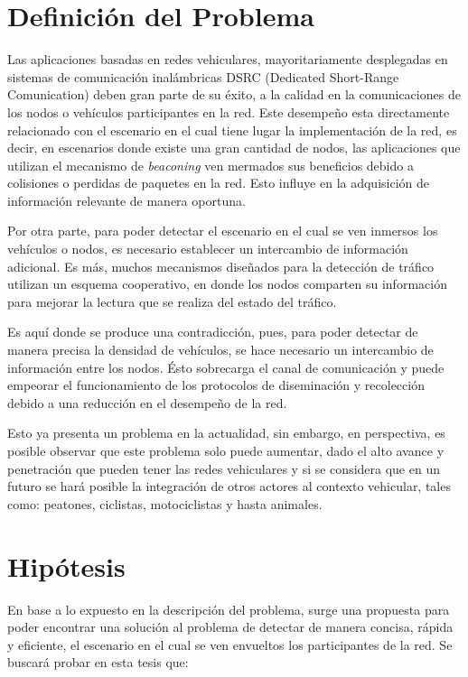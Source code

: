 \section{Definición del Problema}
Las aplicaciones basadas en redes vehiculares, mayoritariamente desplegadas en sistemas de comunicación inalámbricas DSRC (Dedicated Short-Range Comunication) deben gran parte de su éxito, a la calidad en la comunicaciones de los nodos o vehículos participantes en la red. Este desempeño esta directamente relacionado con el escenario en el cual tiene lugar la implementación de la red, es decir, en escenarios donde existe una gran cantidad de nodos, las aplicaciones que utilizan el mecanismo de \textit{beaconing} ven mermados sus beneficios debido a colisiones o perdidas de paquetes en la red. Esto influye en la adquisición de información relevante de manera oportuna. 

Por otra parte, para poder detectar el escenario en el cual se ven inmersos los vehículos o nodos, es necesario establecer un intercambio de información adicional. Es más, muchos mecanismos diseñados para la detección de tráfico utilizan un esquema cooperativo, en donde los nodos comparten su información para mejorar la lectura que se realiza del estado del tráfico.

Es aquí donde se produce una contradicción, pues, para poder detectar de manera precisa la densidad de vehículos, se hace necesario un intercambio de información entre los nodos. Ésto sobrecarga el canal de comunicación y puede empeorar el funcionamiento de los protocolos de diseminación y recolección debido a una reducción en el desempeño de la red. 

Esto ya presenta un problema en la actualidad, sin embargo, en perspectiva, es posible observar que este problema solo puede aumentar, dado el alto avance y penetración que pueden tener las redes vehiculares y si se considera que en un futuro se hará posible la integración de otros actores al contexto vehicular, tales como: peatones, ciclistas, motociclistas y hasta animales. 

\section{Hipótesis}
En base a lo expuesto en la descripción del problema, surge una propuesta para poder encontrar una solución al problema de detectar de manera concisa, rápida y eficiente, el escenario en el cual se ven envueltos los participantes de la red. Se buscará probar en esta tesis que:

